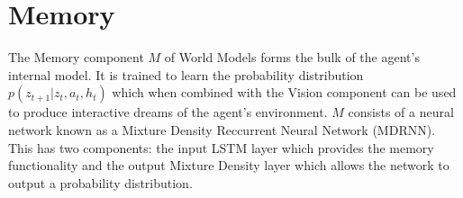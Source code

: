 \documentclass{article}
\numberwithin{figure}{section}
\theoremstyle{definition}
\begin{document}
\section{Memory}
The Memory component $M$ of World Models forms the bulk of the agent's internal model.
It is trained to learn the probability distribution $p(z_{t+1} | z_t, a_t, h_t)$ which when combined with the Vision component can be used to produce interactive dreams of the agent's environment.
$M$ consists of a neural network known as a Mixture Density Reccurrent Neural Network (MDRNN).
This has two components: the input LSTM layer which provides the memory functionality and the output Mixture Density layer which allows the network to output a probability distribution. 

\begin{figure}[h]
  \centering



\begin{tikzpicture}[x=0.75pt,y=0.75pt,yscale=-1,xscale=1]


\end{tikzpicture}
\end{figure}
\end{document}
